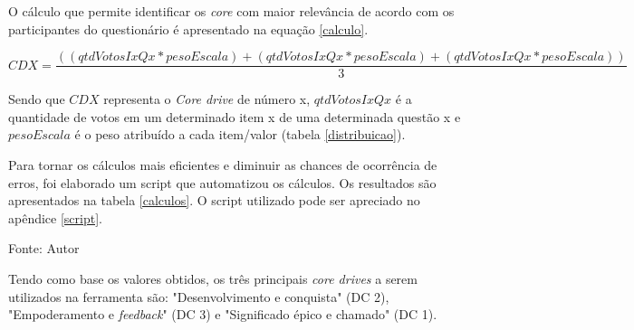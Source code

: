 O cálculo que permite identificar os \textit{core} com maior relevância de acordo com os participantes do questionário é apresentado 
na equação \ref{calculo}.

\begin{equation}
	\label{calculo}
	\scriptstyle CDX = \frac{((qtdVotosIxQx * pesoEscala) + (qtdVotosIxQx * pesoEscala) + (qtdVotosIxQx * pesoEscala)) }{3}
\end{equation}

Sendo que $CDX$ representa o \textit{Core drive} de número x, $qtdVotosIxQx$ é a quantidade de votos em um determinado 
item x de uma determinada questão x e $pesoEscala$ é o peso atribuído a cada item/valor (tabela \ref{distribuicao}).

Para tornar os cálculos mais eficientes e diminuir as chances de ocorrência de erros, foi elaborado um script que automatizou
os cálculos. Os resultados são apresentados na tabela \ref{calculos}. O script utilizado pode ser apreciado no apêndice \ref{script}.
\pagebreak

\begin{table}[h]
	\centering
	\caption{Resultados dos cálculos de relevância.}
	\label{calculos}
	Fonte: Autor
\end{table}

Tendo como base os valores obtidos, os três principais \textit{core drives} a serem utilizados na ferramenta são: "Desenvolvimento e conquista" (DC 2), "Empoderamento
e \textit{feedback}" (DC 3) e "Significado épico e chamado" (DC 1).

